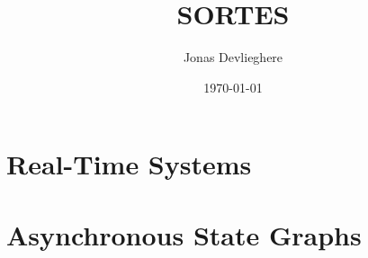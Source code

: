 \documentclass[11pt]{book}
\title{SORTES}
\date{\today}
\author{Jonas Devlieghere}
\theoremstyle{definition}
\begin{document}
\frontmatter

\maketitle

\tableofcontents

\mainmatter
\part{Real-Time Systems}




\part{Asynchronous State Graphs}





\appendix 

\printindex




\nocite{*}
\end{document}
